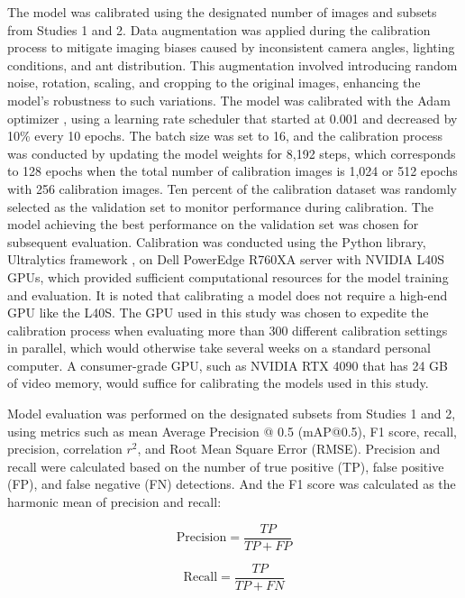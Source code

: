 The model was calibrated using the designated number of images and subsets from Studies 1 and 2. Data augmentation was applied during the calibration process to mitigate imaging biases caused by inconsistent camera angles, lighting conditions, and ant distribution. This augmentation involved introducing random noise, rotation, scaling, and cropping to the original images, enhancing the model’s robustness to such variations. The model was calibrated with the Adam optimizer \cite{kingma_adam_2017}, using a learning rate scheduler that started at 0.001 and decreased by 10\% every 10 epochs. The batch size was set to 16, and the calibration process was conducted by updating the model weights for 8,192 steps, which corresponds to 128 epochs when the total number of calibration images is 1,024 or 512 epochs with 256 calibration images. Ten percent of the calibration dataset was randomly selected as the validation set to monitor performance during calibration. The model achieving the best performance on the validation set was chosen for subsequent evaluation. Calibration was conducted using the Python library, Ultralytics framework \cite{jocher_yolo_2023}, on Dell PowerEdge R760XA server with NVIDIA L40S GPUs, which provided sufficient computational resources for the model training and evaluation. It is noted that calibrating a model does not require a high-end GPU like the L40S. The GPU used in this study was chosen to expedite the calibration process when evaluating more than 300 different calibration settings in parallel, which would otherwise take several weeks on a standard personal computer. A consumer-grade GPU, such as NVIDIA RTX 4090 that has 24 GB of video memory, would suffice for calibrating the models used in this study.

Model evaluation was performed on the designated subsets from Studies 1 and 2, using metrics such as mean Average Precision @ 0.5 (mAP@0.5), F1 score, recall, precision, correlation $r^2$, and Root Mean Square Error (RMSE). Precision and recall were calculated based on the number of true positive (TP), false positive (FP), and false negative (FN) detections. And the F1 score was calculated as the harmonic mean of precision and recall:

\begin{equation}
\text{Precision} = \frac{TP}{TP + FP}
\end{equation}

\begin{equation}
\text{Recall} = \frac{TP}{TP + FN}
\end{equation}

